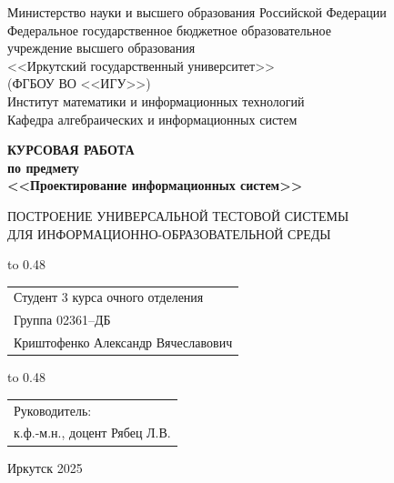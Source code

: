 \thispagestyle{empty}
\begin{center}
Министерство науки и высшего образования Российской Федерации\\
Федеральное государственное бюджетное образовательное\\
учреждение высшего образования\\
<<Иркутский государственный университет>>\\
(ФГБОУ ВО <<ИГУ>>)\\
Институт математики и информационных технологий\\
Кафедра алгебраических и информационных систем\\
\end{center}

\vspace{2.7cm}

\begin{center}
{\bf 
КУРСОВАЯ РАБОТА\\[1mm]
по предмету\\[1mm]
<<Проектирование информационных систем>>
}  

\vspace{0.9cm}

{
ПОСТРОЕНИЕ УНИВЕРСАЛЬНОЙ 
ТЕСТОВОЙ СИСТЕМЫ\\[1mm]
ДЛЯ ИНФОРМАЦИОННО-ОБРАЗОВАТЕЛЬНОЙ СРЕДЫ 
} %
\end{center}

\vspace{2.3cm}

{
\noindent\hbox to 0.48\textwidth {%
	\mbox{ } \hfil} %
	\begin{tabular}[t]{l}
		Студент 3 курса очного отделения\\
		Группа 02361--ДБ\\
		Криштофенко Александр 
		Вячеславович		
	\end{tabular}		
}

\vspace{1.3cm}

{
\noindent\hbox to 0.48\textwidth {%
	\mbox{ } \hfil} %
	\begin{tabular}[t]{l}
		Руководитель:\\ к.ф.-м.н., доцент Рябец Л.В.		
	\end{tabular}		
}


\vfill 
\noindent
\begin{minipage}{\textwidth}
\centering	 Иркутск 2025
\end{minipage}